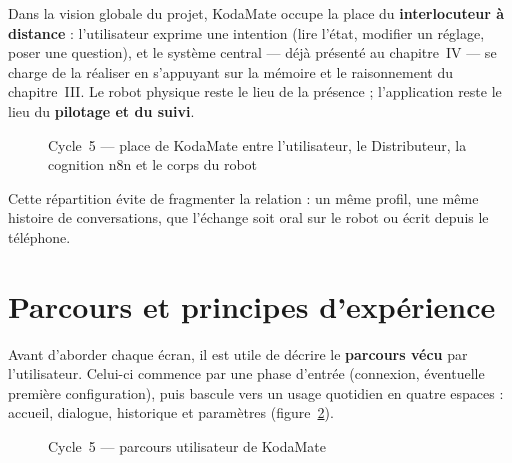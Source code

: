 \documentclass[a4paper,12pt]{report}
\begin{document}
	Dans la vision globale du projet, KodaMate occupe la place du \textbf{interlocuteur
	à distance} : l'utilisateur exprime une intention (lire l'état, modifier un
	réglage, poser une question), et le système central --- déjà présenté au
	chapitre~IV --- se charge de la réaliser en s'appuyant sur la mémoire et le
	raisonnement du chapitre~III. Le robot physique reste le lieu de la présence ;
	l'application reste le lieu du \textbf{pilotage et du suivi}.
	
	\begin{figure}[H]
		\centering
		\caption{Cycle~5 --- place de KodaMate entre l'utilisateur, le Distributeur,
			la cognition n8n et le corps du robot}
		\label{fig:ch5-place-ecosysteme}
	\end{figure}
	
	Cette répartition évite de fragmenter la relation : un même profil, une même
	histoire de conversations, que l'échange soit oral sur le robot ou écrit depuis
	le téléphone.
	
	\section{Parcours et principes d'expérience}
	
	Avant d'aborder chaque écran, il est utile de décrire le \textbf{parcours
	vécu} par l'utilisateur. Celui-ci commence par une phase d'entrée (connexion,
	éventuelle première configuration), puis bascule vers un usage quotidien en
	quatre espaces : accueil, dialogue, historique et paramètres
	(figure~\ref{fig:ch5-parcours-interfaces}).
	
	\begin{figure}[H]
		\centering
		\caption{Cycle~5 --- parcours utilisateur de KodaMate}
		\label{fig:ch5-parcours-interfaces}
	\end{figure}
	
\end{document}
